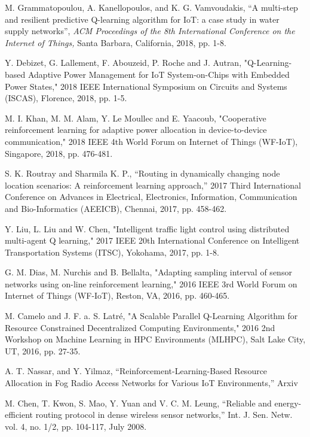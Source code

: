 \documentclass[journal]{IEEEtran}
\begin{document}
\begin{thebibliography}{1}
M. Grammatopoulou, A. Kanellopoulos, and K. G. Vamvoudakis, ``A multi-step and resilient predictive Q-learning algorithm for IoT: a case study in water supply networks'', \emph{ACM Proceedings of the 8th International Conference on the Internet of Things,} Santa Barbara, California, 2018, pp. 1-8.

Y. Debizet, G. Lallement, F. Abouzeid, P. Roche and J. Autran, "Q-Learning-based Adaptive Power Management for IoT System-on-Chips with Embedded Power States," 2018 IEEE International Symposium on Circuits and Systems (ISCAS), Florence, 2018, pp. 1-5.

M. I. Khan, M. M. Alam, Y. Le Moullec and E. Yaacoub, "Cooperative reinforcement learning for adaptive power allocation in device-to-device communication," 2018 IEEE 4th World Forum on Internet of Things (WF-IoT), Singapore, 2018, pp. 476-481.

S. K. Routray and Sharmila K. P., ``Routing in dynamically changing node location scenarios: A reinforcement learning approach,'' 2017 Third International Conference on Advances in Electrical, Electronics, Information, Communication and Bio-Informatics (AEEICB), Chennai, 2017, pp. 458-462.

Y. Liu, L. Liu and W. Chen, "Intelligent traffic light control using distributed multi-agent Q learning," 2017 IEEE 20th International Conference on Intelligent Transportation Systems (ITSC), Yokohama, 2017, pp. 1-8.

G. M. Dias, M. Nurchis and B. Bellalta, "Adapting sampling interval of sensor networks using on-line reinforcement learning," 2016 IEEE 3rd World Forum on Internet of Things (WF-IoT), Reston, VA, 2016, pp. 460-465.

M. Camelo and J. F. a. S. Latré, "A Scalable Parallel Q-Learning Algorithm for Resource Constrained Decentralized Computing Environments," 2016 2nd Workshop on Machine Learning in HPC Environments (MLHPC), Salt Lake City, UT, 2016, pp. 27-35.

A. T. Nassar, and Y. Yilmaz, ``Reinforcement-Learning-Based Resource Allocation in Fog Radio Access Networks for Various IoT Environments,'' Arxiv

M. Chen, T. Kwon, S. Mao, Y. Yuan and V. C. M. Leung, ``Reliable and energy-efficient routing protocol in dense wireless sensor networks,'' Int. J. Sen. Netw.
 vol. 4, no. 1/2, pp. 104-117, July 2008.


\end{thebibliography}
\end{document}

